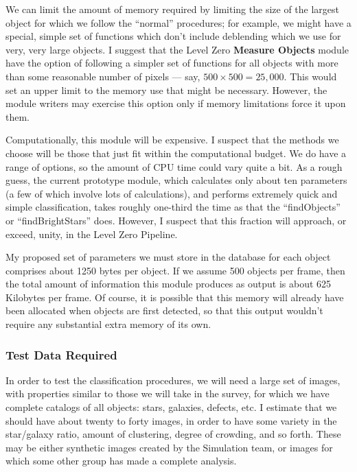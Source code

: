   We can limit the amount of memory required by limiting the
size of the largest object for which we follow the ``normal''
procedures; for example, we might have a special, simple set of
functions which don't include deblending which we use for 
very, very large objects.  I suggest that the Level Zero
{\bf Measure Objects} module have the option of following
a simpler set of functions for all objects with more than some
reasonable number of pixels --- say, $500 \times 500 = 25,000$.
This would set an upper limit to the memory use that
might be necessary.  
However, the module writers may exercise this option only if
memory limitations force it upon them.

  Computationally, this module will be expensive.
I suspect that the methods we choose will be those that
just fit within the computational budget.  We do have
a range of options, so the amount of CPU time could
vary quite a bit.  As a rough guess, the current prototype
module, which calculates only about ten parameters
(a few of which involve lots of calculations), and performs
extremely quick and simple classification, takes roughly
one-third the time as that the ``findObjects'' or 
``findBrightStars'' does.  However, I suspect that this
fraction will approach, or exceed, unity, in the Level
Zero Pipeline.

  My proposed set of parameters we must store in the database 
for each object comprises about 1250 bytes per object.  If we 
assume 500 objects per frame, then the total amount of information
this module produces as output is about 625 Kilobytes per frame.
Of course, it is possible that this memory will already have been
allocated when objects are first detected, so that this output
wouldn't require any substantial extra memory of its own.

\subsubsection {Test Data Required }

  In order to test the classification procedures, we will need
a large set of images, with properties similar to those we will
take in the survey, for which we have complete catalogs of 
all objects: stars, galaxies, defects, etc.  I estimate that we
should have about twenty to forty images, in order to have some
variety in the star/galaxy ratio, amount of clustering, 
degree of crowding, and so forth.  These may be either synthetic
images created by the Simulation team, or images for which
some other group has made a complete analysis.  

